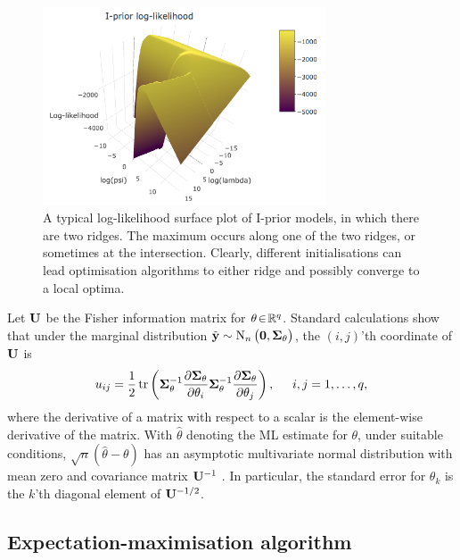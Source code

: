 \begin{figure}[hbt]
  \centering
  \includegraphics[width=0.75\textwidth]{figure/04-iprior-ridge-2}
  \caption[A typical log-likelihood surface plot of I-prior models.]{A typical log-likelihood surface plot of I-prior models, in which there are two ridges. The maximum occurs along one of the two ridges, or sometimes at the intersection. Clearly, different initialisations can lead optimisation algorithms to either ridge and possibly converge to a local optima.}
  \label{fig:ipriorridge}
\end{figure}

Let ${\mathbf U}$ be the Fisher information matrix for $\theta \!\in\!\mathbb{R}^q$.
Standard calculations  show that under the marginal distribution $\tilde{{\mathbf y}} \sim \operatorname{N}_n\big({\mathbf 0}, {\bm\Sigma}_\theta \big)$, the $(i,j)$'th coordinate of ${\mathbf U}$ is 
\begin{equation}
  u_{ij} = 
  \frac{1}{2} \operatorname{tr}\left(
  {\bm\Sigma}_\theta^{-1} \frac{\partial{\bm\Sigma}_\theta}{\partial\theta_i}
  {\bm\Sigma}_\theta^{-1} \frac{\partial{\bm\Sigma}_\theta}{\partial\theta_j} 
  \right), \hspace{0.5cm}i,j=1,\dots,q,
\end{equation}
where the derivative of a matrix with respect to a scalar is the element-wise derivative of the matrix.
With $\hat\theta$ denoting the ML estimate for $\theta$, under suitable conditions, $\surd n (\hat\theta - \theta)$ has an asymptotic multivariate normal distribution with mean zero and covariance matrix ${\mathbf U}^{-1}$ \citep{casella2002statistical}.
In particular, the standard error for $\theta_k$ is the $k$'th diagonal element of ${\mathbf U}^{-1/2}$.

\subsection{Expectation-maximisation algorithm}
\label{sec:emiprior}

